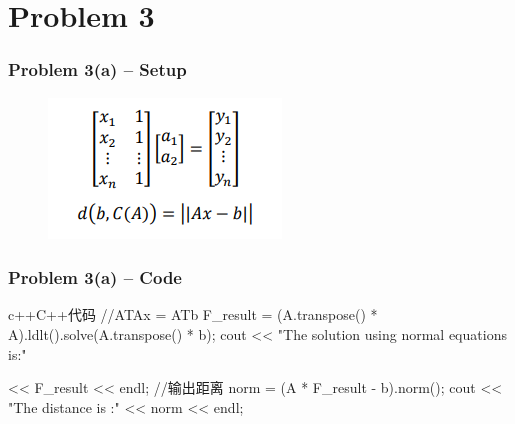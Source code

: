\section{Problem 3}
\begin{frame}
        \frametitle{Problem 3(a) – Setup}

    \begin{figure}
        \centering
        \includegraphics[height = 0.5\textheight]{img/setup3_1.png}
    \end{figure}

    \end{frame}

\begin{frame}[fragile] 
    \frametitle{Problem 3(a) – Code}
    \begin{codeblock}{c++}{C++代码}
        //ATAx = ATb
        F_result = (A.transpose() * A).ldlt().solve(A.transpose() * b);
        cout << "The solution using normal equations is:\n"

            << F_result << endl;
        //输出距离
        norm = (A * F_result - b).norm();
        cout << "The distance is :\n"
            << norm << endl;
    \end{codeblock}
\end{frame}

